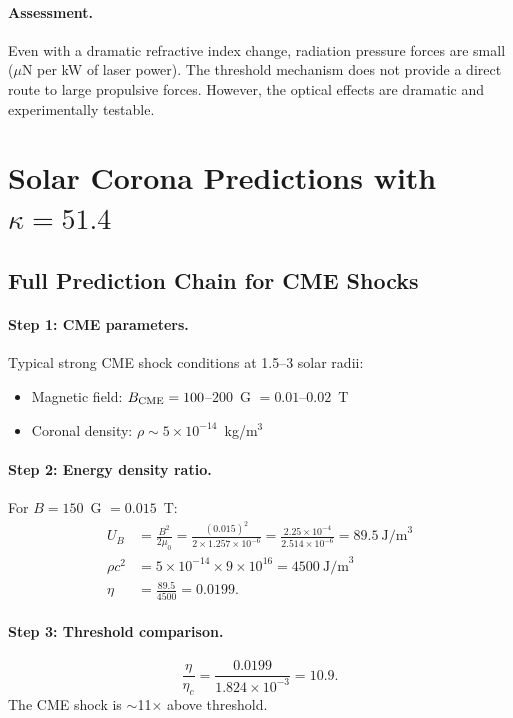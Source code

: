 \documentclass[12pt,a4paper]{article}
\theoremstyle{remark}
\begin{document}
\paragraph{Assessment.}
Even with a dramatic refractive index change, radiation pressure forces are
small ($\mu$N per kW of laser power). The threshold mechanism does not
provide a direct route to large propulsive forces. However, the optical
effects are dramatic and experimentally testable.

\section{Solar Corona Predictions with $\kappa = 51.4$}

\subsection{Full Prediction Chain for CME Shocks}

\paragraph{Step 1: CME parameters.}
Typical strong CME shock conditions at 1.5--3 solar radii:
\begin{itemize}
\item Magnetic field: $B_{\rm CME} = 100$--$200$~G $= 0.01$--$0.02$~T
\item Coronal density: $\rho \sim 5 \times 10^{-14}$~kg/m$^3$
\end{itemize}

\paragraph{Step 2: Energy density ratio.}
For $B = 150$~G $= 0.015$~T:
\begin{align}
U_B &= \frac{B^2}{2\mu_0} = \frac{(0.015)^2}{2 \times 1.257 \times 10^{-6}}
= \frac{2.25 \times 10^{-4}}{2.514 \times 10^{-6}} = 89.5~\text{J/m}^3 \\
\rho c^2 &= 5 \times 10^{-14} \times 9 \times 10^{16} = 4500~\text{J/m}^3 \\
\eta &= \frac{89.5}{4500} = 0.0199.
\end{align}

\paragraph{Step 3: Threshold comparison.}
\begin{equation}
\frac{\eta}{\eta_c} = \frac{0.0199}{1.824 \times 10^{-3}} = 10.9.
\end{equation}
The CME shock is $\sim$11$\times$ above threshold.
\end{document}

